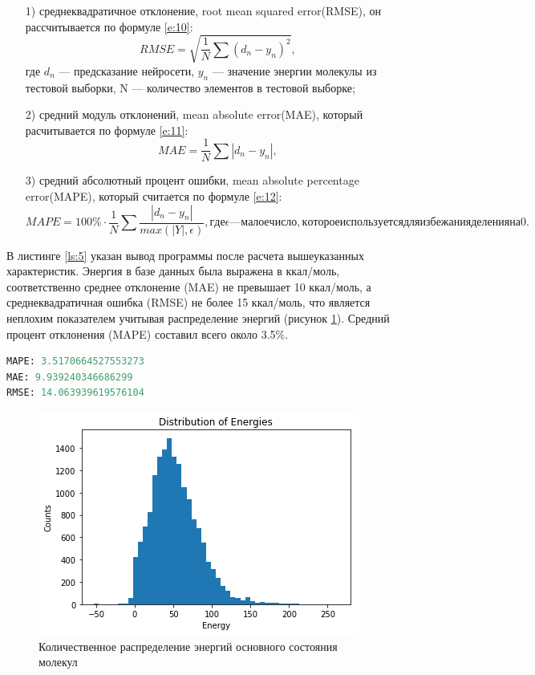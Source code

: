 \begin{enumerate}
    \item [1)] среднеквадратичное отклонение, root mean squared error(RMSE), он рассчитывается по формуле \ref{e:10}:
    \begin{equation} \label{e:10}
        RMSE = \sqrt{\frac{1}{N}\sum (d_{n}-y_{n})^2},
    \end{equation} 
    где $d_n$ — предсказание нейросети, $y_n$ — значение энергии молекулы из тестовой выборки, N — количество элементов в тестовой выборке;
    \item [2)] средний модуль отклонений, mean absolute error(MAE), который расчитывается по формуле \ref{e:11}:
    \begin{equation} \label{e:11}
        MAE = \frac{1}{N}\sum |d_{n}-y_{n}|,
    \end{equation}
    \item [3)] средний абсолютный процент ошибки, mean absolute percentage error(MAPE), который считается по формуле \ref{e:12}:
    \begin{equation} \label{e:12}
        MAPE = 100\% \cdot \frac{1}{N}\sum \frac{|d_{n}-y_{n}|}{max(|Y|, \epsilon)},
        где \epsilon — малое число, которое используется для избежания деления на 0.
    \end{equation}
\end{enumerate}
В листинге \ref{ls:5} указан вывод программы после расчета вышеуказанных характеристик. Энергия в базе данных была выражена в ккал/моль, соответственно среднее отклонение (MAE) не превышает 10 ккал/моль, а среднеквадратичная ошибка (RMSE) не более 15 ккал/моль, что является неплохим показателем учитывая распределение энергий (рисунок \ref{fig:7}). Средний процент отклонения (MAPE) составил всего около 3.5\%.   
\begin{lstlisting}[caption={Посчитанные значения метрик качества},language=python,label={ls:5}] 
MAPE: 3.5170664527553273
MAE: 9.939240346686299
RMSE: 14.063939619576104
\end{lstlisting}

\begin{figure}[!h] 
  \center
  \includegraphics [scale=1.0] {img/dist.png}
  \caption{Количественное распределение энергий основного состояния молекул} 
  \label{fig:7}  
\end{figure}



